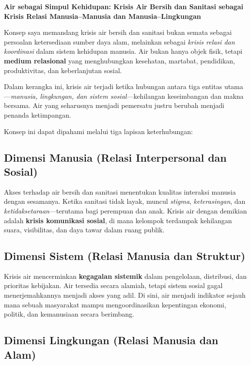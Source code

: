 \documentclass[
  letterpaper,
  DIV=11,
  numbers=noendperiod]{scrreprt}
\begin{document}
\textbf{Air sebagai Simpul Kehidupan: Krisis Air Bersih dan Sanitasi
sebagai Krisis Relasi Manusia--Manusia dan Manusia--Lingkungan}

Konsep saya memandang krisis air bersih dan sanitasi bukan semata
sebagai persoalan ketersediaan sumber daya alam, melainkan sebagai
\emph{krisis relasi dan koordinasi} dalam sistem kehidupan manusia. Air
bukan hanya objek fisik, tetapi \textbf{medium relasional} yang
menghubungkan kesehatan, martabat, pendidikan, produktivitas, dan
keberlanjutan sosial.

Dalam kerangka ini, krisis air terjadi ketika hubungan antara tiga
entitas utama---\emph{manusia, lingkungan, dan sistem
sosial}---kehilangan keseimbangan dan makna bersama. Air yang seharusnya
menjadi pemersatu justru berubah menjadi penanda ketimpangan.

Konsep ini dapat dipahami melalui tiga lapisan keterhubungan:

\subsection{Dimensi Manusia (Relasi Interpersonal dan
Sosial)}\label{dimensi-manusia-relasi-interpersonal-dan-sosial}

Akses terhadap air bersih dan sanitasi menentukan kualitas interaksi
manusia dengan sesamanya. Ketika sanitasi tidak layak, muncul
\emph{stigma}, \emph{keterasingan}, dan
\emph{ketidaksetaraan}---terutama bagi perempuan dan anak. Krisis air
dengan demikian adalah \textbf{krisis komunikasi sosial}, di mana
kelompok terdampak kehilangan suara, visibilitas, dan daya tawar dalam
ruang publik.

\subsection{Dimensi Sistem (Relasi Manusia dan
Struktur)}\label{dimensi-sistem-relasi-manusia-dan-struktur}

Krisis air mencerminkan \textbf{kegagalan sistemik} dalam pengelolaan,
distribusi, dan prioritas kebijakan. Air tersedia secara alamiah, tetapi
sistem sosial gagal menerjemahkannya menjadi akses yang adil. Di sini,
air menjadi indikator sejauh mana sebuah masyarakat mampu
mengoordinasikan kepentingan ekonomi, politik, dan kemanusiaan secara
berimbang.

\subsection{Dimensi Lingkungan (Relasi Manusia dan
Alam)}\label{dimensi-lingkungan-relasi-manusia-dan-alam}
\end{document}
